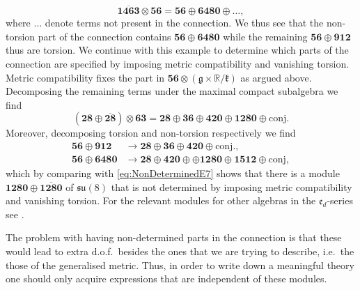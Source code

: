 \begin{equation}
    \overbar{\mathbf{1463}}\otimes\mathbf{56} = \mathbf{56}\oplus\mathbf{6480}\oplus\ldots,
\end{equation}
where $\ldots$ denote terms not present in the connection. We thus see that the non-torsion part of the connection contains $\mathbf{56}\oplus \mathbf{6480}$ while the remaining $\mathbf{56}\oplus\mathbf{912}$ thus are torsion. We continue with this example to determine which parts of the connection are specified by imposing metric compatibility and vanishing torsion. Metric compatibility fixes the part in $\mathbf{56}\otimes(\mathfrak{g}\times\mathbb{R}/\mathfrak{k})$ as argued above. Decomposing the remaining terms under the maximal compact subalgebra we find 
\begin{equation}\label{eq:NonDeterminedE7}
    \left(\mathbf{28}\oplus\overbar{\mathbf{28}}\right)\otimes\mathbf{63} = \mathbf{28}\oplus\mathbf{36}\oplus\mathbf{420}\oplus\mathbf{1280}\oplus \text{conj.}
\end{equation}
Moreover, decomposing torsion and non-torsion respectively we find  
\begin{equation}
    \begin{aligned}
        \mathbf{56}\oplus\mathbf{912}&\to \mathbf{28}\oplus\mathbf{36}\oplus\mathbf{420}\oplus\text{conj.},\\
        \mathbf{56}\oplus\mathbf{6480}&\to\mathbf{28}\oplus\mathbf{420}\oplus\oplus\mathbf{1280}\oplus\mathbf{1512}\oplus\text{conj},
    \end{aligned}
\end{equation}
which by comparing with \eqref{eq:NonDeterminedE7} shows that there is a module $\mathbf{1280}\oplus\overbar{\mathbf{1280}}$ of $\mathfrak{su}(8)$ that is not determined by imposing metric compatibility and vanishing torsion. For the relevant modules for other algebras in the $\mathfrak{e}_{d}$-series see \cite{Cederwall:2013naa}. 

The problem with having non-determined parts in the connection is that these would lead to extra d.o.f.\ besides the ones that we are trying to describe, i.e.\ the those of the generalised metric. Thus, in order to write down a meaningful theory one should only acquire expressions that are independent of these modules.





